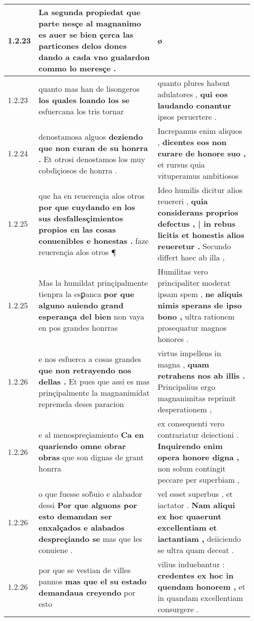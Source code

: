 \begin{tabular}{|p{1cm}|p{6.5cm}|p{6.5cm}|}
1.2.23 & La segunda propiedat que parte nesçe al magnanimo es \textbf{ auer se bien çerca las particones delos dones dando a cada vno } gualardon commo lo meresçe . & ø \\\hline
1.2.23 & quanto mas han de lisongeros \textbf{ los quales loando los se } esfuercana los tris tornar & quanto plures habent adulatores , \textbf{ qui eos laudando conantur } ipsos peruertere . \\\hline
1.2.24 & denostamosa alguos \textbf{ deziendo que non curan de su honrra . } Et otrosi denostamos los muy cobdiçiosos de honrra . & Increpamus enim aliquos , \textbf{ dicentes eos non curare de honore suo , } et rursus quia vituperamus ambitiosos \\\hline
1.2.25 & que ha en reuerençia alos otros \textbf{ por que cuydando en los sus desfallesçimientos propios en las cosas conuenibles e honestas . } faze reuerençia alos otros ¶ & Ideo humilis dicitur alios reuereri , \textbf{ quia considerans proprios defectus , | in rebus licitis et honestis alios reueretur . } Secundo differt haec ab illa , \\\hline
1.2.25 & Mas la humildat prinçipalmente tienpra la esꝑanca \textbf{ por que alguno auiendo grand esperança del bien } non vaya en pos grandes honrras & Humilitas vero principaliter moderat ipsam spem , \textbf{ ne aliquis nimis sperans de ipso bono , } ultra rationem prosequatur magnos honores . \\\hline
1.2.26 & e nos esfuerca a cosas grandes \textbf{ que non retrayendo nos dellas . } Et pues que assi es mas prinçipalmente la magnanimidat repremela deses paracion & virtus impellens in magna , \textbf{ quam retrahens nos ab illis . } Principalius ergo magnanimitas reprimit desperationem , \\\hline
1.2.26 & e al menospreçiamiento \textbf{ Ca en quariendo omne obrar obras } que son dignas de grant honrra & ex consequenti vero contrariatur deiectioni . \textbf{ Inquirendo enim opera honore digna , } non solum contingit peccare per superbiam , \\\hline
1.2.26 & o que fuesse sob̃uio e alabador dessi \textbf{ Por que alguons por esto demandan ser enxalçados e alabados despreçiando se } mas que les conuiene . & vel esset superbus , et iactator . \textbf{ Nam aliqui ex hoc quaerunt excellentiam et iactantiam , } deiiciendo se ultra quam deceat . \\\hline
1.2.26 & por que se vestian de villes pannos \textbf{ mas que el su estado demandaua creyendo } por esto & vilius induebantur : \textbf{ credentes ex hoc in quendam honorem , } et in quandam excellentiam consurgere . \\\hline

\end{tabular}
